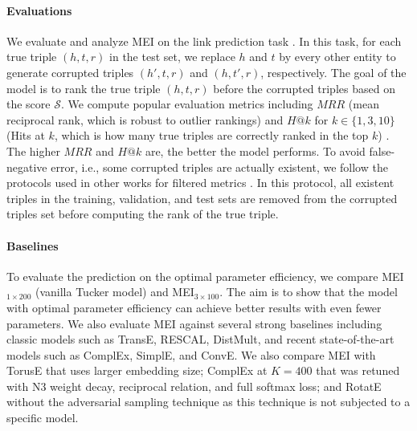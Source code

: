 \documentclass{ecai}
\def\gS{{\mathcal{S}}}
\theoremstyle{plain}  \newtheorem{thm}{Theorem}  \newtheorem{lem}[thm]{Lemma}  \newtheorem{prop}[thm]{Proposition}
\theoremstyle{remark}  \newtheorem*{rem}{Remark}
\begin{document}
\paragraph{Evaluations}
We evaluate and analyze MEI on the link prediction task \cite{bordes_translatingembeddingsmodeling_2013}. In this task, for each true triple $ (h, t, r) $ in the test set, we replace $ h $ and $ t $ by every other entity to generate corrupted triples $ (h', t, r) $ and $ (h, t', r) $, respectively. The goal of the model is to rank the true triple $ (h, t, r) $ before the corrupted triples based on the score $ \gS $. We compute popular evaluation metrics including $ MRR $ (mean reciprocal rank, which is robust to outlier rankings) and $ H@k $ for $ k \in \{1, 3, 10\} $ (Hits at $ k $, which is how many true triples are correctly ranked in the top $ k $) \cite{trouillon_complexembeddingssimple_2016}. The higher $ MRR $ and $ H@k $ are, the better the model performs. To avoid false-negative error, i.e., some corrupted triples are actually existent, we follow the protocols used in other works for filtered metrics \cite{bordes_translatingembeddingsmodeling_2013}. In this protocol, all existent triples in the training, validation, and test sets are removed from the corrupted triples set before computing the rank of the true triple.

\paragraph{Baselines}
To evaluate the prediction on the optimal parameter efficiency, we compare MEI$ _{1 \times 200} $ (vanilla Tucker model) and MEI$ _{3 \times 100} $. The aim is to show that the model with optimal parameter efficiency can achieve better results with even fewer parameters. We also evaluate MEI against several strong baselines including classic models such as TransE, RESCAL, DistMult, and recent state-of-the-art models such as ComplEx, SimplE, and ConvE. We also compare MEI with TorusE that uses larger embedding size; ComplEx at $ K = 400 $ that was retuned with N3 weight decay, reciprocal relation, and full softmax loss; and RotatE without the adversarial sampling technique as this technique is not subjected to a specific model.
\end{document}
